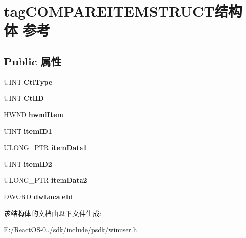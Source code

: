 \hypertarget{structtag_c_o_m_p_a_r_e_i_t_e_m_s_t_r_u_c_t}{}\section{tag\+C\+O\+M\+P\+A\+R\+E\+I\+T\+E\+M\+S\+T\+R\+U\+C\+T结构体 参考}
\label{structtag_c_o_m_p_a_r_e_i_t_e_m_s_t_r_u_c_t}
\subsection*{Public 属性}
\begin{DoxyCompactItemize}
\item 
\mbox{\label{structtag_c_o_m_p_a_r_e_i_t_e_m_s_t_r_u_c_t_a52c481920dbbed8ab0ce1d29b26d0244}} 
U\+I\+NT {\bfseries Ctl\+Type}
\item 
\mbox{\label{structtag_c_o_m_p_a_r_e_i_t_e_m_s_t_r_u_c_t_a6affef5a7c243bb88cf9d183b9a0b5ec}} 
U\+I\+NT {\bfseries Ctl\+ID}
\item 
\mbox{\label{structtag_c_o_m_p_a_r_e_i_t_e_m_s_t_r_u_c_t_a9af8199d7ad54b7670713ca954d1a77d}} 
\hyperlink{interfacevoid}{H\+W\+ND} {\bfseries hwnd\+Item}
\item 
\mbox{\label{structtag_c_o_m_p_a_r_e_i_t_e_m_s_t_r_u_c_t_a5d460843dd2bed1b112f75caefe6a661}} 
U\+I\+NT {\bfseries item\+I\+D1}
\item 
\mbox{\label{structtag_c_o_m_p_a_r_e_i_t_e_m_s_t_r_u_c_t_ab2cdac5894e07a7c602afd8a055b75b7}} 
U\+L\+O\+N\+G\+\_\+\+P\+TR {\bfseries item\+Data1}
\item 
\mbox{\label{structtag_c_o_m_p_a_r_e_i_t_e_m_s_t_r_u_c_t_af6ee2081009748a8ab51d39c54b8f20f}} 
U\+I\+NT {\bfseries item\+I\+D2}
\item 
\mbox{\label{structtag_c_o_m_p_a_r_e_i_t_e_m_s_t_r_u_c_t_aea1617288e30e72c58e2cf02766918fc}} 
U\+L\+O\+N\+G\+\_\+\+P\+TR {\bfseries item\+Data2}
\item 
\mbox{\label{structtag_c_o_m_p_a_r_e_i_t_e_m_s_t_r_u_c_t_af652a413cd59d1903f6494491d8f16b4}} 
D\+W\+O\+RD {\bfseries dw\+Locale\+Id}
\end{DoxyCompactItemize}


该结构体的文档由以下文件生成\+:\begin{DoxyCompactItemize}
\item 
E\+:/\+React\+O\+S-\/0../sdk/include/psdk/winuser.\+h\end{DoxyCompactItemize}
